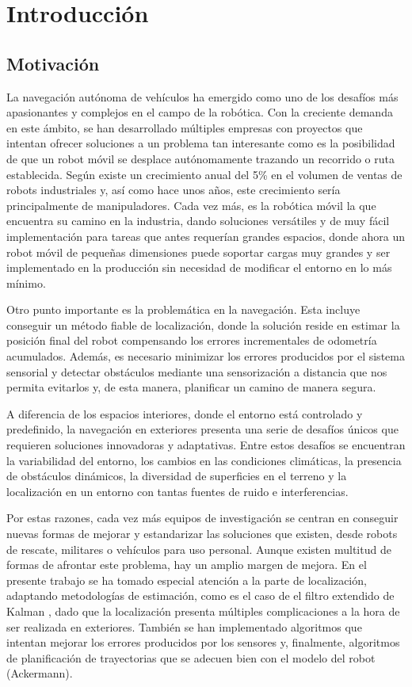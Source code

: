 \chapter{Introducción}

\section{Motivación}

\noindent 
La navegación autónoma de vehículos ha emergido como uno de los desafíos más apasionantes y complejos en el campo de la robótica. 
Con la creciente demanda en este ámbito, se han desarrollado múltiples empresas con proyectos que intentan ofrecer soluciones a un 
problema tan interesante como es la posibilidad de que un robot móvil se desplace autónomamente trazando un recorrido o ruta establecida. 
Según \cite{IFR23} existe un crecimiento anual del 5\% en el volumen de ventas de robots industriales y, así como hace unos años, este 
crecimiento sería principalmente de manipuladores. Cada vez más, es la robótica móvil la que encuentra su camino en la industria, dando 
soluciones versátiles y de muy fácil implementación para tareas que antes requerían grandes espacios, donde ahora un robot móvil de 
pequeñas dimensiones puede soportar cargas muy grandes y ser implementado en la producción sin necesidad de modificar el entorno en lo 
más mínimo.

Otro punto importante es la problemática en la navegación. Esta incluye conseguir 
un método fiable de localización, donde la solución reside en estimar la posición 
final del robot compensando los errores incrementales de odometría acumulados. 
Además, es necesario minimizar los errores producidos por el sistema sensorial y 
detectar obstáculos mediante una sensorización a distancia que nos permita evitarlos y, 
de esta manera, planificar un camino de manera segura.

A diferencia de los espacios interiores, donde el entorno está controlado y predefinido, la navegación en exteriores presenta una serie 
de desafíos únicos que requieren soluciones innovadoras y adaptativas. Entre estos desafíos se encuentran la variabilidad del entorno, 
los cambios en las condiciones climáticas, la presencia de obstáculos dinámicos, la diversidad de superficies en el terreno y la 
localización en un entorno con tantas fuentes de ruido e interferencias.

Por estas razones, cada vez más equipos de investigación se centran en conseguir nuevas formas de mejorar y estandarizar las soluciones 
que existen, desde robots de rescate, militares o vehículos para uso personal. Aunque existen multitud de formas de afrontar este problema, 
hay un amplio margen de mejora. En el presente trabajo se ha tomado especial atención a la parte de localización, adaptando metodologías 
de estimación, como es el caso de el filtro extendido de Kalman \cite{Rolan20}, dado que la localización presenta múltiples complicaciones a la hora de 
ser realizada en exteriores. También se han implementado algoritmos que intentan mejorar los errores producidos por los sensores y, 
finalmente, algoritmos de planificación de trayectorias que se adecuen bien con el modelo del robot (Ackermann).

